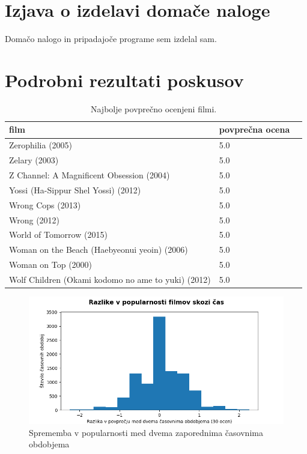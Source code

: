 \documentclass[a4paper,11pt]{article}
\begin{document}
\section{Izjava o izdelavi domače naloge}
Domačo nalogo in pripadajoče programe sem izdelal sam.

\appendix
\appendixpage
\section{\label{app-res}Podrobni rezultati poskusov}

\begin{table}[htbp]
\caption{Najbolje povprečno ocenjeni filmi.}
\label{tab2}
\begin{center}
\begin{tabular}{llp{3cm}}
\hline
film & povprečna ocena \\
\hline
Zerophilia (2005) & 5.0 \\
Zelary (2003) & 5.0 \\
Z Channel: A Magnificent Obsession (2004) & 5.0 \\
Yossi (Ha-Sippur Shel Yossi) (2012) & 5.0 \\
Wrong Cops (2013) & 5.0 \\
Wrong (2012) & 5.0 \\
World of Tomorrow (2015) & 5.0 \\
Woman on the Beach (Haebyeonui yeoin) (2006) & 5.0 \\
Woman on Top (2000) & 5.0 \\
Wolf Children (Okami kodomo no ame to yuki) (2012) & 5.0 \\
\hline
\end{tabular}
\end{center}
\end{table}

\begin{figure}[htbp]
\begin{center}
\includegraphics[scale=0.7]{popularityChangesHist.png}
\caption{Sprememba v popularnosti med dvema zaporednima časovnima obdobjema} \label{fig:img3}
\end{center}
\end{figure}
\end{document}
